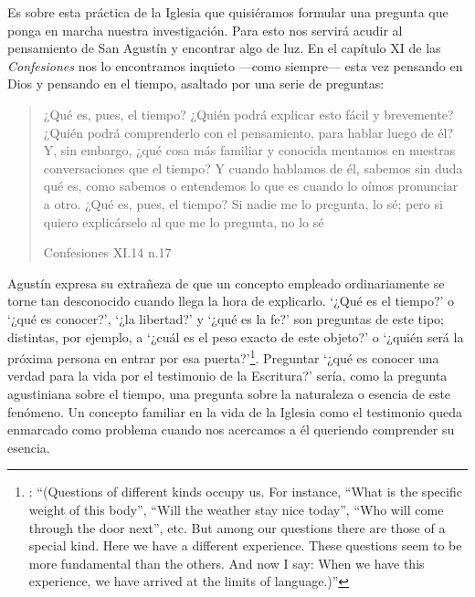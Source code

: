 Es sobre esta práctica de la Iglesia que quisiéramos formular una pregunta que ponga en marcha nuestra investigación. Para esto nos servirá acudir al pensamiento de San Agustín y encontrar algo de luz. En el capítulo XI de las \emph{Confesiones} nos lo encontramos inquieto ---como siempre--- esta vez pensando en Dios y pensando en el tiempo, asaltado por una serie de preguntas:

\blockquote[Confesiones XI.14 n.17]{¿Qué es, pues, el tiempo? ¿Quién podrá explicar esto fácil y brevemente? ¿Quién podrá comprenderlo con el pensamiento, para hablar luego de él? Y, sin embargo, ¿qué cosa más familiar y conocida mentamos en nuestras conversaciones que el tiempo? Y cuando hablamos de él, sabemos sin duda qué es, como sabemos o entendemos lo que es cuando lo oímos pronunciar a otro. ¿Qué es, pues, el tiempo? Si nadie me lo pregunta, lo sé; pero si quiero explicárselo al que me lo pregunta, no lo sé}.

Agustín expresa su extrañeza de que un concepto empleado ordinariamente se torne tan desconocido cuando llega la hora de explicarlo. \enquote*{¿Qué es el tiempo?} o \enquote*{¿qué es conocer?}, \enquote*{¿la libertad?} y \enquote*{¿qué es la fe?} son preguntas de este tipo; distintas, por ejemplo, a \enquote*{¿cuál es el peso exacto de este objeto?} o \enquote*{¿quién será la próxima persona en entrar por esa puerta?}\footnote{\cite[Cf.~][304]{wittgenstein2005bt}: \enquote{(Questions of different kinds occupy us. For instance, ``What is the specific weight of this body'', ``Will the weather stay nice today'', ``Who will come through the door next'', etc. But among our questions there are those of a special kind. Here we have a different experience. These questions seem to be more fundamental than the others. And now I say: When we have this experience, we have arrived at the limits of language.)}}. Preguntar \enquote*{¿qué es conocer una verdad para la vida por el testimonio de la Escritura?} sería, como la pregunta agustiniana sobre el tiempo, una pregunta sobre la naturaleza o esencia de este fenómeno. Un concepto familiar en la vida de la Iglesia como el testimonio queda enmarcado como problema cuando nos acercamos a él queriendo comprender su esencia.


